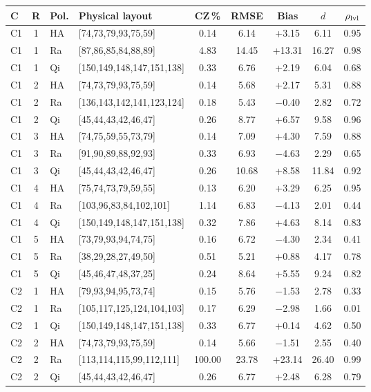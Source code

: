 \begin{tabular}[t]{@{}lclp{2.75cm}ccccc@{}}
\toprule
C & R & Pol. & Physical layout & CZ\,\% & RMSE & Bias & $d$ & $\rho_{\rm lvl}$ \\
\midrule
C1 & 1 & HA & [74,73,79,93,75,59] & 0.14 & 6.14 & +3.15 & 6.11 & 0.95 \\
C1 & 1 & Ra & [87,86,85,84,88,89] & 4.83 & 14.45 & +13.31 & 16.27 & 0.98 \\
C1 & 1 & Qi & [150,149,148,147,151,138] & 0.33 & 6.76 & +2.19 & 6.04 & 0.68 \\
C1 & 2 & HA & [74,73,79,93,75,59] & 0.14 & 5.68 & +2.17 & 5.31 & 0.88 \\
C1 & 2 & Ra & [136,143,142,141,123,124] & 0.18 & 5.43 & $-$0.40 & 2.82 & 0.72 \\
C1 & 2 & Qi & [45,44,43,42,46,47] & 0.26 & 8.77 & +6.57 & 9.58 & 0.96 \\
C1 & 3 & HA & [74,75,59,55,73,79] & 0.14 & 7.09 & +4.30 & 7.59 & 0.88 \\
C1 & 3 & Ra & [91,90,89,88,92,93] & 0.33 & 6.93 & $-$4.63 & 2.29 & 0.65 \\
C1 & 3 & Qi & [45,44,43,42,46,47] & 0.26 & 10.68 & +8.58 & 11.84 & 0.92 \\
C1 & 4 & HA & [75,74,73,79,59,55] & 0.13 & 6.20 & +3.29 & 6.25 & 0.95 \\
C1 & 4 & Ra & [103,96,83,84,102,101] & 1.14 & 6.83 & $-$4.13 & 2.01 & 0.44 \\
C1 & 4 & Qi & [150,149,148,147,151,138] & 0.32 & 7.86 & +4.63 & 8.14 & 0.83 \\
C1 & 5 & HA & [73,79,93,94,74,75] & 0.16 & 6.72 & $-$4.30 & 2.34 & 0.41 \\
C1 & 5 & Ra & [38,29,28,27,49,50] & 0.51 & 5.21 & +0.88 & 4.17 & 0.78 \\
C1 & 5 & Qi & [45,46,47,48,37,25] & 0.24 & 8.64 & +5.55 & 9.24 & 0.82 \\
C2 & 1 & HA & [79,93,94,95,73,74] & 0.15 & 5.76 & $-$1.53 & 2.78 & 0.33 \\
C2 & 1 & Ra & [105,117,125,124,104,103] & 0.17 & 6.29 & $-$2.98 & 1.66 & 0.01 \\
C2 & 1 & Qi & [150,149,148,147,151,138] & 0.33 & 6.77 & +0.14 & 4.62 & 0.50 \\
C2 & 2 & HA & [74,73,79,93,75,59] & 0.14 & 5.66 & $-$1.51 & 2.55 & 0.40 \\
C2 & 2 & Ra & [113,114,115,99,112,111] & 100.00 & 23.78 & +23.14 & 26.40 & 0.99 \\
C2 & 2 & Qi & [45,44,43,42,46,47] & 0.26 & 6.77 & +2.48 & 6.28 & 0.79 \\

\end{tabular}
